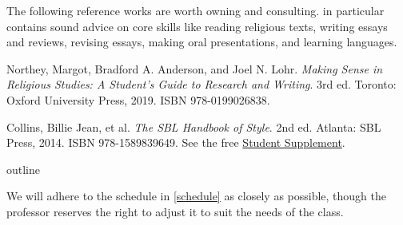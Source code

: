 \documentclass[titlepage]{article}
\begin{document}
The following reference works are worth owning and consulting.
\cite{rlgs} in particular contains sound advice on core skills like
reading religious texts, writing essays and reviews, revising essays,
making oral presentations, and learning languages.

\begingroup
\renewcommand{\section}[2]{}%
\begin{thebibliography}{Making Sense}%

	 Northey, Margot, Bradford A. Anderson, and Joel N. Lohr.
	\emph{Making Sense in Religious Studies: A Student's Guide to Research and Writing}.
	3rd ed. Toronto: Oxford University Press, 2019. ISBN 978-0199026838.

	 Collins, Billie Jean, et al.
	\emph{The SBL Handbook of Style}.
	2nd ed. Atlanta: SBL Press, 2014. ISBN 978-1589839649. See the free
	\href{https://www.sbl-site.org/assets/pdfs/pubs/SBLHSsupp2015-02.pdf}{Student Supplement}.

\end{thebibliography}
\endgroup

\section{Course Outline}
\label{outline}

We will adhere to the schedule in \autoref{schedule} as closely as
possible, though the professor reserves the right to adjust it to suit
the needs of the class.
\end{document}
